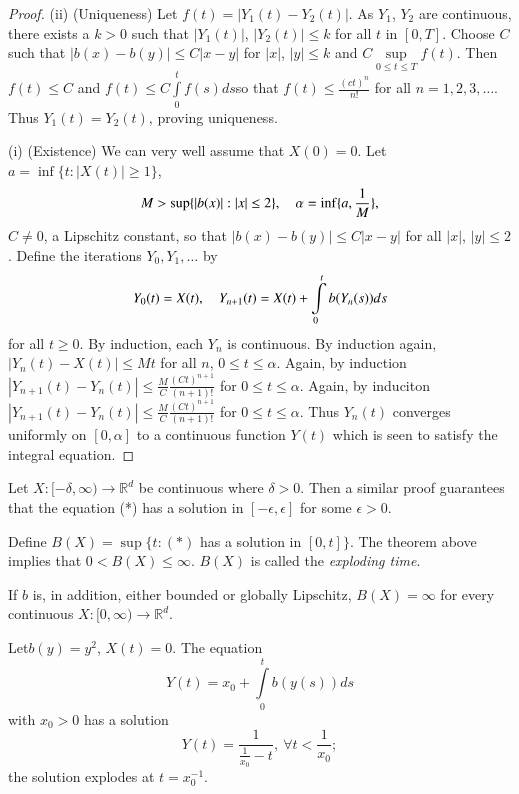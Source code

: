\begin{proof}
(ii) (Uniqueness) Let $f(t)=|Y_{1}(t)-Y_{2}(t)|$. As $Y_{1}$, $Y_{2}$
  are continuous, there exists a $k>0$ such that $|Y_{1}(t)|$,
  $|Y_{2}(t)|\leq k$ for all $t$ in $[0,T]$. Choose $C$ such that
  $|b(x)-b(y)|\leq C|x-y|$ for $|x|$, $|y|\leq k$ and
  $C\sup\limits_{0\leq t\leq T}f(t)$. Then $f(t)\leq C$ and $f(t)\leq
  C\int\limits^{t}_{0}f(s)ds$\pageoriginale so that $f(t)\leq
  \frac{(ct)^{n}}{n!}$ for all $n=1,2,3,\ldots$. Thus
  $Y_{1}(t)=Y_{2}(t)$, proving uniqueness.

(i) (Existence) We can very well assume that $X(0)=0$. Let
  $a=\inf\{t:|X(t)|\geq 1\}$,
$$
M>\sup \{|b(x)|:|x|\leq 2\},\quad \alpha=\inf\{a,\frac{1}{M}\},
$$
$C\neq 0$, a Lipschitz constant, so that $|b(x)-b(y)|\leq C|x-y|$ for
all $|x|$, $|y|\leq 2$. Define the iterations $Y_{0},Y_{1},\ldots$ by
$$
Y_{0}(t)=X(t),\quad Y_{n+1}(t)=X(t)+\int\limits^{t}_{0}b(Y_{n}(s))ds
$$
for all $t\geq 0$. By induction, each $Y_{n}$ is continuous. By
induction again, $|Y_{n}(t)-X(t)|\leq Mt$ for all $n$, $0\leq t\leq
\alpha$. Again, by induction $|Y_{n+1}(t)-Y_{n}(t)|\leq
\frac{M}{C}\frac{(Ct)^{n+1}}{(n+1)!}$ for $0\leq t\leq \alpha$. Again,
by induciton $|Y_{n+1}(t)-Y_{n}(t)|\leq
\frac{M}{C}\frac{(Ct)^{n+1}}{(n+1)!}$ for $0\leq t\leq \alpha$. Thus
$Y_{n}(t)$ converges uniformly on $[0,\alpha]$ to a continuous
function $Y(t)$ which is seen to satisfy the integral equation.
\end{proof}

\begin{remark*}
Let $X:[-\delta,\infty)\to \mathbb{R}^{d}$ be continuous where $\delta>0$. Then
  a similar proof guarantees that the equation (*) has a solution in
  $[-\epsilon,\epsilon]$ for some $\epsilon>0$.

Define $B(X)=\sup \{t:(*)$ has a solution in $[0,t]\}$. The theorem
above implies that $0<B(X)\leq \infty$. $B(X)$ is called the {\em
  exploding time}.
\end{remark*}

\begin{remark*}
If $b$ is, in addition, either bounded or globally Lipschitz,\break
$B(X)=\infty$ for every continuous $X:[0,\infty)\to \mathbb{R}^{d}$.
\end{remark*}

\begin{example*}
Let\pageoriginale $b(y)=y^{2}$, $X(t)=0$. The equation
$$
Y(t)=x_{0}+\int\limits^{t}_{0}b(y(s))ds
$$
with $x_{0}>0$ has a solution
$$
Y(t)=\frac{1}{\frac{1}{x_{0}}-t},\ \forall t<\frac{1}{x_{0}};
$$
the solution explodes at $t=x^{-1}_{0}$.
\end{example*}

